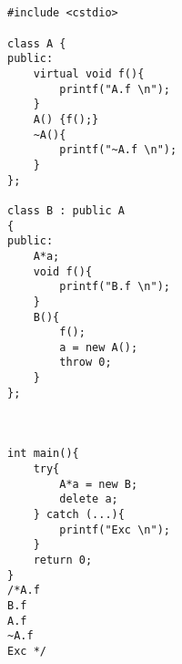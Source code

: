 \documentclass{article}
\begin{document}
\newpage

\subsection{}
\begin{multicols}{2}
\begin{verbatim}
#include <cstdio>

class A {
public:
    virtual void f(){
        printf("A.f \n");
    }
    A() {f();}
    ~A(){
        printf("~A.f \n");
    }
};

class B : public A
{
public:
    A*a;
    void f(){
        printf("B.f \n");
    }
    B(){
        f();
        a = new A();
        throw 0;
    }
};



int main(){
    try{
        A*a = new B;
        delete a;
    } catch (...){
        printf("Exc \n");
    }
    return 0;
}
/*A.f
B.f
A.f
~A.f
Exc */
\end{verbatim}
\end{multicols}

\newpage
\end{document}
